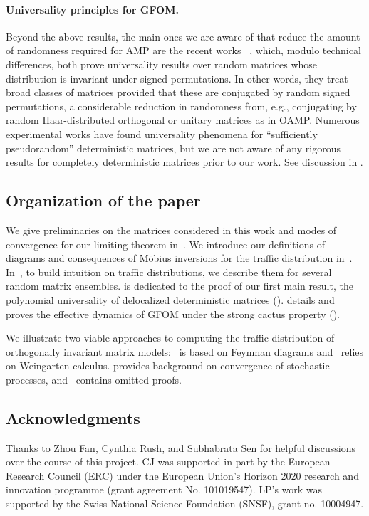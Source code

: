 \paragraph{Universality principles for GFOM.}
Beyond the above results, the main ones we are aware of that reduce the amount of randomness required for AMP are the recent works ~\cite{wang2022universality,dudeja2023universality}, which, modulo technical differences, both prove universality results over random matrices whose distribution is invariant under signed permutations.
In other words, they treat broad classes of matrices provided that these are conjugated by random signed permutations, a considerable reduction in randomness from, e.g., conjugating by random Haar-distributed orthogonal or unitary matrices as in OAMP.
Numerous experimental works have found universality phenomena for ``sufficiently pseudorandom'' deterministic matrices, but we are not aware of any rigorous results for completely deterministic matrices prior to our work.
See discussion in \cite{CO-2019-TAPEquationAMPInvariant,schniter2020simple,abbara2020universality,dudeja2023universality}.

\subsection{Organization of the paper}


We give preliminaries on the matrices considered
in this work and modes of convergence for
our limiting theorem in~.
We introduce our definitions of diagrams and
consequences of M{\"o}bius inversions for the
traffic distribution in~. In~, to build intuition on
traffic distributions,
we describe them for several random matrix 
ensembles.
 is dedicated to the proof
of our first main result, the polynomial
universality of delocalized deterministic matrices ().
 details and proves
the effective dynamics of GFOM under the 
strong cactus property ().

We illustrate
two viable approaches to computing the 
traffic distribution
of orthogonally invariant matrix models:~ is based on Feynman
diagrams and~ relies on
Weingarten calculus.  provides background on convergence
of stochastic processes, and~ contains omitted proofs.


\subsection{Acknowledgments}

Thanks to Zhou Fan, Cynthia Rush, and Subhabrata Sen for helpful discussions over the course of this project.
CJ was supported in part by the European Research Council (ERC) under the European Union's Horizon 2020 research and innovation programme (grant agreement No.
101019547).
LP's work was supported by the Swiss National Science Foundation (SNSF), grant no. 10004947.